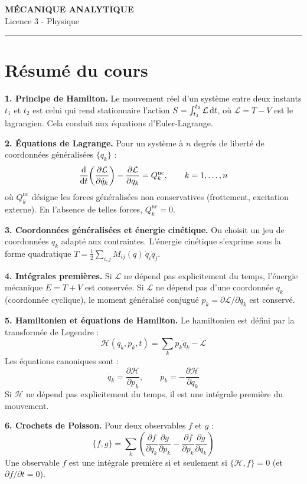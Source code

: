 \documentclass[12pt,a4paper]{article}
\begin{document}
\fi

\begin{center}
  {\LARGE\bfseries MÉCANIQUE ANALYTIQUE}\\[0.3cm]
  {\normalsize Licence 3 - Physique}\\[0.1cm]
  \rule{0.7\textwidth}{0.8pt}
\end{center}

\vspace{0.3cm}

\section*{Résumé du cours}

\begin{boiteresume}

\textbf{1. Principe de Hamilton.} Le mouvement réel d'un système entre deux instants $t_1$ et $t_2$ est celui qui rend stationnaire l'action $S = \int_{t_1}^{t_2} \mathcal{L}\,\mathrm{d} t$, où $\mathcal{L} = T - V$ est le lagrangien. Cela conduit aux équations d'Euler-Lagrange.

\textbf{2. Équations de Lagrange.} Pour un système à $n$ degrés de liberté de coordonnées généralisées $\{q_k\}$ :
\[
  \frac{\mathrm{d}}{\mathrm{d} t}\!\left(\frac{\partial \mathcal{L}}{\partial \dot{q}_k}\right) - \frac{\partial \mathcal{L}}{\partial q_k} = Q_k^{\mathrm{nc}}, \qquad k = 1,\ldots,n
\]
où $Q_k^{\mathrm{nc}}$ désigne les forces généralisées non conservatives (frottement, excitation externe). En l'absence de telles forces, $Q_k^{\mathrm{nc}} = 0$.

\textbf{3. Coordonnées généralisées et énergie cinétique.} On choisit un jeu de coordonnées $q_k$ adapté aux contraintes. L'énergie cinétique s'exprime sous la forme quadratique $T = \frac{1}{2}\sum_{i,j} M_{ij}(q)\,\dot{q}_i\dot{q}_j$.

\textbf{4. Intégrales premières.} Si $\mathcal{L}$ ne dépend pas explicitement du temps, l'énergie mécanique $E = T + V$ est conservée. Si $\mathcal{L}$ ne dépend pas d'une coordonnée $q_k$ (coordonnée cyclique), le moment généralisé conjugué $p_k = \partial\mathcal{L}/\partial\dot{q}_k$ est conservé.

\textbf{5. Hamiltonien et équations de Hamilton.} Le hamiltonien est défini par la transformée de Legendre :
\[
  \mathcal{H}(q_k, p_k, t) = \sum_k p_k\dot{q}_k - \mathcal{L}
\]
Les équations canoniques sont :
\[
  \dot{q}_k = \frac{\partial\mathcal{H}}{\partial p_k}, \qquad \dot{p}_k = -\frac{\partial\mathcal{H}}{\partial q_k}
\]
Si $\mathcal{H}$ ne dépend pas explicitement du temps, il est une intégrale première du mouvement.

\textbf{6. Crochets de Poisson.} Pour deux observables $f$ et $g$ :
\[
  \{f, g\} = \sum_k\left(\frac{\partial f}{\partial q_k}\frac{\partial g}{\partial p_k} - \frac{\partial f}{\partial p_k}\frac{\partial g}{\partial q_k}\right)
\]
Une observable $f$ est une intégrale première si et seulement si $\{\mathcal{H}, f\} = 0$ (et $\partial f/\partial t = 0$).

\end{boiteresume}
\end{document}
